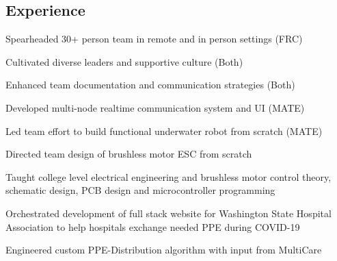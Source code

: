 \documentclass[]{deedy-long-resume}
\begin{document}
\begin{paracol}{2}
%
%
\switchcolumn


\section{Experience}
\vspace{\topsep}
\begin{tightemize}
\item Spearheaded 30+ person team in remote and in person settings (FRC)
\item Cultivated diverse leaders and supportive culture (Both)
\item Enhanced team documentation and communication strategies (Both)
\item Developed multi-node realtime communication system and UI (MATE)
\item Led team effort to build functional underwater robot from scratch (MATE)
\end{tightemize}
\sectionsep

\vspace{-.05cm} %
\begin{tightemize}
\item Directed team design of brushless motor ESC from scratch
\item Taught college level electrical engineering and brushless motor control theory, schematic design, PCB design and microcontroller programming
\end{tightemize}
\sectionsep

\begin{tightemize}
\item Orchestrated development of full stack website for Washington State Hospital Association to help hospitals exchange needed PPE during COVID-19
\item Engineered custom PPE-Distribution algorithm with input from MultiCare
\end{tightemize}
\sectionsep


\end{paracol}
\end{document}
